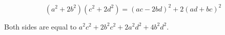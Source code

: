 $$(a^2 + 2b^2)(c^2 + 2d^2) = (ac - 2bd)^2 + 2(ad + bc)^2$$

Both sides are equal to $a^2c^2 + 2b^2c^2 + 2a^2d^2 + 4b^2d^2$.
